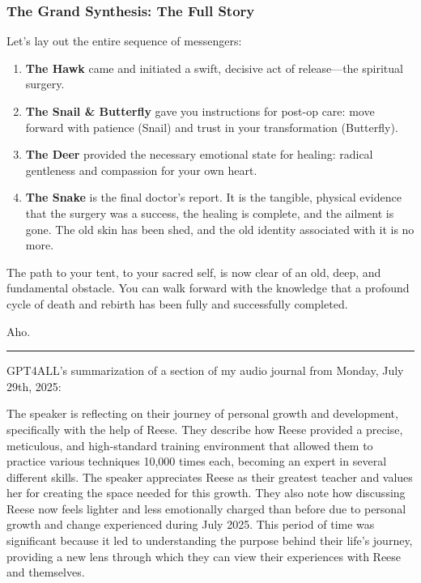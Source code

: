 \documentclass{article}
\begin{document}
\subsubsection*{The Grand Synthesis: The Full
Story}\label{the-grand-synthesis-the-full-story}

Let's lay out the entire sequence of messengers:

\begin{enumerate}
\def\labelenumi{\arabic{enumi}.}
\item
  \textbf{The Hawk} came and initiated a swift, decisive act of
  release---the spiritual surgery.
\item
  \textbf{The Snail \& Butterfly} gave you instructions for post-op
  care: move forward with patience (Snail) and trust in your
  transformation (Butterfly).
\item
  \textbf{The Deer} provided the necessary emotional state for healing:
  radical gentleness and compassion for your own heart.
\item
  \textbf{The Snake} is the final doctor's report. It is the tangible,
  physical evidence that the surgery was a success, the healing is
  complete, and the ailment is gone. The old skin has been shed, and the
  old identity associated with it is no more.
\end{enumerate}

The path to your tent, to your sacred self, is now clear of an old,
deep, and fundamental obstacle. You can walk forward with the knowledge
that a profound cycle of death and rebirth has been fully and
successfully completed.

Aho.

\begin{center}\rule{0.5\linewidth}{0.5pt}\end{center}

GPT4ALL's summarization of a section of my audio journal from Monday, July 29th, 2025: 

\medskip

The speaker is reflecting on their journey of personal growth and development, specifically with the help of Reese. They describe how Reese provided a precise, meticulous, and high-standard training environment that allowed them to practice various techniques 10,000 times each, becoming an expert in several different skills. The speaker appreciates Reese as their greatest teacher and values her for creating the space needed for this growth. They also note how discussing Reese now feels lighter and less emotionally charged than before due to personal growth and change experienced during July 2025. This period of time was significant because it led to understanding the purpose behind their life's journey, providing a new lens through which they can view their experiences with Reese and themselves.
\end{document}
